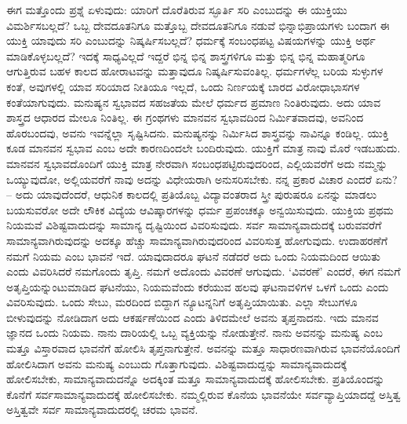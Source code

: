 ಈಗ ಮತ್ತೊಂದು ಪ್ರಶ್ನೆ ಏಳುವುದು: ಯಾರಿಗೆ ದೊರೆತಿರುವ ಸ್ಫೂರ್ತಿ ಸರಿ ಎಂಬುದನ್ನು ಈ ಯುಕ್ತಿಯು ವಿಮರ್ಶಿಸಬಲ್ಲದೆ? ಒಬ್ಬ ದೇವದೂತನಿಗೂ ಮತ್ತೊಬ್ಬ ದೇವದೂತನಿಗೂ ನಡುವೆ ಭಿನ್ನಾಭಿಪ್ರಾಯಗಳು ಬಂದಾಗ ಈ ಯುಕ್ತಿ ಯಾವುದು ಸರಿ ಎಂಬುದನ್ನು ನಿಷ್ಕರ್ಷಿಸಬಲ್ಲದೆ? ಧರ್ಮಕ್ಕೆ ಸಂಬಂಧಪಟ್ಟ ವಿಷಯಗಳನ್ನು ಯುಕ್ತಿ ಅರ್ಥ ಮಾಡಿಕೊಳ್ಳಬಲ್ಲದೆ? ಇದಕ್ಕೆ ಸಾಧ್ಯವಿಲ್ಲದೆ ಇದ್ದರೆ ಭಿನ್ನ ಭಿನ್ನ ಶಾಸ್ತ್ರಗಳಿಗೂ ಮತ್ತು ಭಿನ್ನ ಭಿನ್ನ ಮಹಾತ್ಮರಿಗೂ ಆಗುತ್ತಿರುವ ಬಹಳ ಕಾಲದ ಹೋರಾಟವನ್ನು ಮತ್ತಾವುದೂ ನಿಷ್ಕರ್ಷಿಸುವಂತಿಲ್ಲ. ಧರ್ಮಗಳೆಲ್ಲ ಬರಿಯ ಸುಳ್ಳುಗಳ ಕಂತೆ, ಅವುಗಳಲ್ಲಿ ಯಾವ ಸರಿಯಾದ ನೀತಿಯೂ ಇಲ್ಲದೆ, ಒಂದು ನಿರ್ಣಯಕ್ಕೆ ಬಾರದ ವಿರೋಧಾಭಾಸಗಳ ಕಂತೆಯಾಗುವುದು. ಮನುಷ್ಯನ ಸ್ವಭಾವದ ಸಹಜತೆಯ ಮೇಲೆ ಧರ್ಮದ ಪ್ರಮಾಣ ನಿಂತಿರುವುದು. ಅದು ಯಾವ ಶಾಸ್ತ್ರದ ಆಧಾರದ ಮೇಲೂ ನಿಂತಿಲ್ಲ. ಈ ಗ್ರಂಥಗಳು ಮಾನವನ ಸ್ವಭಾವದಿಂದ ನಿರ್ಮಿತವಾದವು, ಅವನಿಂದ ಹೊರಬಂದವು, ಅವನು ಇವನ್ನೆಲ್ಲಾ ಸೃಷ್ಟಿಸಿದನು. ಮನುಷ್ಯನನ್ನು ನಿರ್ಮಿಸಿದ ಶಾಸ್ತ್ರವನ್ನು ನಾವಿನ್ನೂ ಕಂಡಿಲ್ಲ. ಯುಕ್ತಿ ಕೂಡ ಮಾನವನ ಸ್ವಭಾವ ಎಂಬ ಅದೇ ಕಾರಣದಿಂದಲೇ ಬಂದಿರುವುದು. ಯುಕ್ತಿಗೆ ಮಾತ್ರ ನಾವು ಮೊರೆ ಇಡಬಹುದು. ಮಾನವನ ಸ್ವಭಾವದೊಂದಿಗೆ ಯುಕ್ತಿ ಮಾತ್ರ ನೇರವಾಗಿ ಸಂಬಂಧಪಟ್ಟಿರುವುದರಿಂದ, ಎಲ್ಲಿಯವರೆಗೆ ಅದು ನಮ್ಮನ್ನು ಒಯ್ಯುವುದೋ, ಅಲ್ಲಿಯವರೆಗೆ ನಾವು ಅದನ್ನು ವಿಧೇಯರಾಗಿ ಅನುಸರಿಸಬೇಕು. ನನ್ನ ಪ್ರಕಾರ ವಿಚಾರ ಎಂದರೆ ಏನು? – ಅದು ಯಾವುದೆಂದರೆ, ಆಧುನಿಕ ಕಾಲದಲ್ಲಿ ಪ್ರತಿಯೊಬ್ಬ ವಿದ್ಯಾವಂತರಾದ ಸ್ತ್ರೀ ಪುರುಷರೂ ಏನನ್ನು ಮಾಡಲು ಬಯಸುವರೋ ಅದೇ ಲೌಕಿಕ ವಿದ್ಯೆಯ ಆವಿಷ್ಕಾರಗಳನ್ನು ಧರ್ಮ ಪ್ರಪಂಚಕ್ಕೂ ಅನ್ವಯಿಸುವುದು. ಯುಕ್ತಿಯ ಪ್ರಥಮ ನಿಯಮವೆ ವಿಶಿಷ್ಟವಾದುದನ್ನು  ಸಾಮಾನ್ಯ ದೃಷ್ಟಿಯಿಂದ  ವಿವರಿಸುವುದು. ಸರ್ವ ಸಾಮಾನ್ಯವಾದುದಕ್ಕೆ ಬರುವವರೆಗೆ ಸಾಮಾನ್ಯವಾಗಿರುವುದನ್ನು ಅದಕ್ಕೂ ಹೆಚ್ಚು ಸಾಮಾನ್ಯವಾಗಿರುವುದರಿಂದ ವಿವರಿಸುತ್ತ ಹೋಗುವುದು. ಉದಾಹರಣೆಗೆ ನಮಗೆ ನಿಯಮ ಎಂಬ ಭಾವನೆ ಇದೆ. ಯಾವುದಾದರೂ ಘಟನೆ ನಡೆದರೆ ಅದು ಒಂದು ನಿಯಮದಿಂದ ಆಯಿತು ಎಂದು ವಿವರಿಸಿದರೆ ನಮಗೊಂದು ತೃಪ್ತಿ. ನಮಗೆ ಅದೊಂದು ವಿವರಣೆ ಆಗುವುದು. `ವಿವರಣೆ' ಎಂದರೆ, ಈಗ ನಮಗೆ ಅತೃಪ್ತಿಯನ್ನುಂಟುಮಾಡಿದ ಘಟನೆಯು, ನಿಯಮವೆಂದು ಕರೆಯುವ ಹಲವು ಘಟನಾವಳಿಗಳ ಒಳಗೆ ಒಂದು ಎಂದು ವಿವರಿಸುವುದು. ಒಂದು ಸೇಬು, ಮರದಿಂದ ಬಿದ್ದಾಗ ನ್ಯೂಟನ್ನನಿಗೆ ಅತೃಪ್ತಿಯಾಯಿತು. ಎಲ್ಲಾ ಸೇಬುಗಳೂ ಬೀಳುವುದನ್ನು ನೋಡಿದಾಗ ಅದು ಆಕರ್ಷಣೆಯಿಂದ ಎಂದು ತಿಳಿದಮೇಲೆ ಅವನು ತೃಪ್ತನಾದನು. ಇದು ಮಾನವ ಜ್ಞಾನದ ಒಂದು ನಿಯಮ. ನಾನು ದಾರಿಯಲ್ಲಿ ಒಬ್ಬ ವ್ಯಕ್ತಿಯನ್ನು ನೋಡುತ್ತೇನೆ. ನಾನು ಅವನನ್ನು ಮನುಷ್ಯ ಎಂಬ ಮತ್ತೂ ವಿಸ್ತಾರವಾದ ಭಾವನೆಗೆ ಹೋಲಿಸಿ ತೃಪ್ತನಾಗುತ್ತೇನೆ. ಅವನನ್ನು ಮತ್ತೂ ಸಾಧಾರಣವಾಗಿರುವ ಭಾವನೆಯೊಂದಿಗೆ ಹೋಲಿಸಿದಾಗ ಅವನು ಮನುಷ್ಯ ಎಂಬುದು ಗೊತ್ತಾಗುವುದು. ವಿಶಿಷ್ಟವಾದುದ್ದನ್ನು ಸಾಮಾನ್ಯವಾದುದಕ್ಕೆ ಹೋಲಿಸಬೇಕು, ಸಾಮಾನ್ಯವಾದುದನ್ನೊ ಅದಕ್ಕಿಂತ ಮತ್ತೂ ಸಾಮಾನ್ಯವಾದುದಕ್ಕೆ ಹೋಲಿಸಬೇಕು. ಪ್ರತಿಯೊಂದನ್ನು ಕೊನೆಗೆ ಸರ್ವಸಾಮಾನ್ಯವಾದುದಕ್ಕೆ ಹೋಲಿಸಬೇಕು. ನಮ್ಮಲ್ಲಿರುವ ಕೊನೆಯ ಭಾವನೆಯೇ  ಸರ್ವವ್ಯಾಪ್ತಿಯಾದದ್ದೆ ಅಸ್ತಿತ್ವ  ಅಸ್ತಿತ್ವವೇ ಸರ್ವ ಸಾಮಾನ್ಯವಾದುದರಲ್ಲಿ ಚರಮ ಭಾವನೆ.

